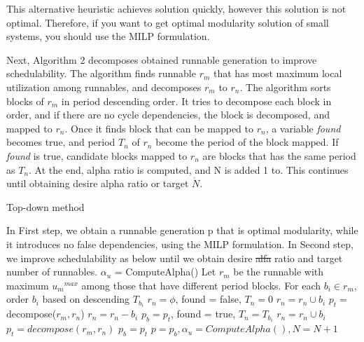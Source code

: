 \documentclass[conference,compsoc]{IEEEtran}
\providecommand{\DIFadd}[1]{{\protect\color{blue}\uwave{#1}}} %
\providecommand{\DIFdel}[1]{{\protect\color{red}\sout{#1}}}                      %
\providecommand{\DIFaddbegin}{} %
\providecommand{\DIFaddend}{} %
\providecommand{\DIFdelbegin}{} %
\providecommand{\DIFdelend}{} %
\begin{document}
 This alternative heuristic achieves solution quickly, however this solution is not optimal.
Therefore, if you want to get optimal modularity solution of small systems, you should use the MILP formulation.


Next, Algorithm 2 decomposes obtained runnable generation to improve schedulability.
The algorithm finds runnable $r_m$ that has most maximum local utilization among runnables, and decomposes $r_m$ to $r_n$.
The algorithm sorts blocks of $r_m$ in period descending order.
It tries to decompose each block in order, and if there are no cycle dependencies, the block is decomposed, and mapped to $r_n$.
Once it finds block that can be mapped to $r_n$, a variable {\it found} becomes true, and period $T_n$ of $r_n$ become the period of the block mapped.
If {\it found} is true, candidate blocks mapped to $r_n$ are blocks that has the same period as $T_n$.
At the end, alpha ratio is computed, and N is added 1 to.
This continues until obtaining desire alpha ratio or target $\acute{N}$.


\begin{algorithm}                      
\caption{Top-down method}         
\label{alg2}                        

\begin{algorithmic}[1]
\STATE In First step, we obtain a runnable generation p that is optimal modularity, while it introduces no false dependencies, using the MILP formulation.
\STATE In Second step, we improve schedulability as below until we obtain desire \DIFdelbegin \DIFdel{alfa }\DIFdelend \DIFaddbegin \DIFadd{Alfa }\DIFaddend ratio and target number of runnables.
\STATE $\alpha_u$ = ComputeAlpha()
	\STATE Let $r_m$ be the runnable with maximum $u{_m}^{max}$ among those that have different period blocks.
	\STATE For each $b_i \in r_m$, order $b_i$ based on descending $T_{b_i}$
	\STATE $r_n = \phi$, found = false, $T_n = 0$
			\STATE $r_n = r_n \cup b_i$
			\STATE $p_t = $ decompose($r_m,r_n$)
				\STATE $r_n = r_n - b_i$
			\ELSE 
			\STATE $p_b = p_t$, found = true, $T_n = T_{b_i}$
			\ENDIF
		\ELSE
				\STATE $r_n = r_n \cup b_i$
				\STATE $p_t = decompose(r_m,r_n)$
			\ELSE
				\STATE $p_b = p_t$
			\ENDIF
		\ENDIF
	\ENDFOR
	\STATE $p = p_b, \alpha_u = ComputeAlpha(), N = N + 1$
\ENDWHILE
\end{algorithmic}
\end{algorithm}
\end{document}
